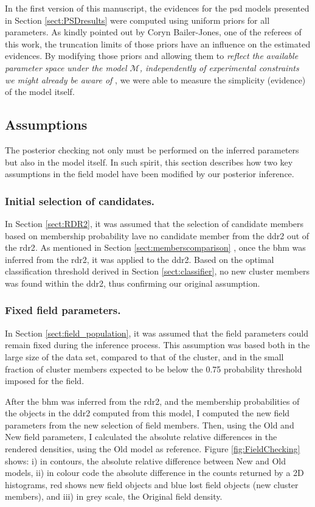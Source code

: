 In the first version of this manuscript, the evidences for the \gls{psd} models presented in Section \ref{sect:PSDresults} were computed using uniform priors for all parameters. As kindly pointed out by Coryn Bailer-Jones, one of the referees of this work, the truncation limits of those priors have an influence on the estimated evidences. By modifying those priors and allowing them to \textit{reflect the available parameter space under the model $\mathcal{M}$, independently of experimental constraints we might already be aware of} \cite[taken from][]{Trotta2008}, we were able to measure the simplicity (evidence) of the model itself. 

\subsection{Assumptions}
The posterior checking not only must be performed on the inferred parameters but also in the model itself. In such spirit, this section describes how two key assumptions in the field model have been modified by our posterior inference.

\subsubsection{Initial selection of candidates.}

In Section \ref{sect:RDR2}, it was assumed that the selection of candidate members based on membership probability lave no candidate member from the \gls{ddr2} out of the \gls{rdr2}. As mentioned in Section \ref{sect:memberscomparison}
, once the \gls{bhm} was inferred from the \gls{rdr2}, it was applied to the \gls{ddr2}. Based on the optimal classification threshold derived in Section \ref{sect:classifier}, no new cluster members was found within the \gls{ddr2}, thus confirming our original assumption.

\subsubsection{Fixed field parameters.}

In Section \ref{sect:field_population}, it was assumed that the field parameters could remain fixed during the inference process. This assumption was based  both in the large size of the data set, compared to that of the cluster, and in the small fraction of cluster members expected to be below the 0.75 probability threshold imposed for the field.

After the \gls{bhm} was inferred from the \gls{rdr2}, and the membership probabilities of the objects in the \gls{ddr2} computed from this model, I computed the new field parameters from the new selection of field members. Then, using the Old and New field parameters, I calculated the absolute relative differences in the rendered densities, using the Old model as reference. Figure \ref{fig:FieldChecking} shows: i) in contours, the absolute relative difference between New and Old models, ii) in colour code the absolute difference in the counts returned by a 2D histograms, red shows new field objects and blue lost field objects (new cluster members), and iii) in grey scale, the Original field density.

